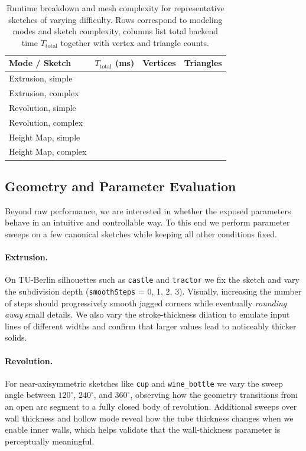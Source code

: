 \documentclass[11pt, a4paper]{article}
\begin{document}
\begin{table}[t]
    \centering
    \caption{Runtime breakdown and mesh complexity for representative sketches of varying difficulty. Rows correspond to modeling modes and sketch complexity, columns list total backend time $T_{\text{total}}$ together with vertex and triangle counts.}
    \label{tab:performance}
    \begin{tabular}{lccc}
        \toprule
        Mode / Sketch & $T_{\text{total}}$ (ms) & Vertices & Triangles \\
        \midrule
        Extrusion, simple   &  &  &  \\
        Extrusion, complex  &  &  &  \\
        Revolution, simple  &  &  &  \\
        Revolution, complex &  &  &  \\
        Height Map, simple  &  &  &  \\
        Height Map, complex &  &  &  \\
        \bottomrule
    \end{tabular}
\end{table}

\subsection{Geometry and Parameter Evaluation}
Beyond raw performance, we are interested in whether the exposed parameters behave in an intuitive and controllable way. To this end we perform parameter sweeps on a few canonical sketches while keeping all other conditions fixed.

\paragraph{Extrusion.} On TU-Berlin silhouettes such as \texttt{castle} and \texttt{tractor} we fix the sketch and vary the subdivision depth (\texttt{smoothSteps} = 0, 1, 2, 3). Visually, increasing the number of steps should progressively smooth jagged corners while eventually \emph{rounding away} small details. We also vary the stroke-thickness dilation to emulate input lines of different widths and confirm that larger values lead to noticeably thicker solids.

\paragraph{Revolution.} For near-axisymmetric sketches like \texttt{cup} and \texttt{wine\_bottle} we vary the sweep angle between $120^\circ$, $240^\circ$, and $360^\circ$, observing how the geometry transitions from an open arc segment to a fully closed body of revolution. Additional sweeps over wall thickness and hollow mode reveal how the tube thickness changes when we enable inner walls, which helps validate that the wall-thickness parameter is perceptually meaningful.
\end{document}
